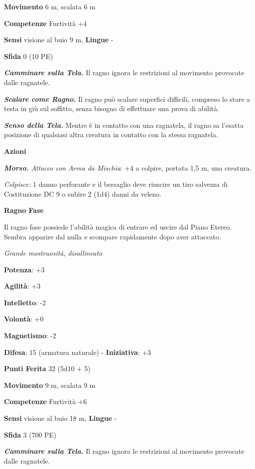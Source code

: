 \begin{multicols}{2}
\textbf{Movimento} 6 m, scalata 6 m

\textbf{Competenze} Furtività +4

\textbf{Sensi} visione al buio 9 m, 
\textbf{Lingue} -

\textbf{Sfida} 0 (10 PE)

\emph{\textbf{Camminare sulla Tela.}} Il ragno ignora le restrizioni al
movimento provocate dalle ragnatele.

\emph{\textbf{Scalare come Ragno.}} Il ragno può scalare superfici
difficili, compreso lo stare a testa in giù sul soffitto, senza bisogno
di effettuare una prova di abilità.

\emph{\textbf{Senso della Tela.}} Mentre è in contatto con una
ragnatela, il ragno sa l'esatta posizione di qualsiasi altra creatura in
contatto con la stessa ragnatela.

\textbf{Azioni}

\emph{\textbf{Morso.} Attacco con Arma da Mischia}: +4 a colpire,
portata 1,5 m, una creatura.

\emph{Colpisce:} 1 danno perforante e il bersaglio deve riuscire un tiro
salvezza di Costituzione DC 9 o subire 2 (1d4) danni da veleno.



\textbf{Ragno Fase}

Il ragno fase possiede l'abilità magica di entrare ed uscire dal Piano
Etereo. Sembra apparire dal nulla e scompare rapidamente dopo aver
attaccato.

\emph{Grande mostruosità, disallineato}

\textbf{Potenza}: +3

\textbf{Agilità}: +3

\textbf{Intelletto}: -2

\textbf{Volontà}: +0

\textbf{Magnetismo}: -2

\textbf{Difesa}: 15 (armatura naturale) - \textbf{Iniziativa}: +3

\textbf{Punti Ferita} 32 (5d10 + 5)

\textbf{Movimento} 9 m, scalata 9 m

\textbf{Competenze} Furtività +6

\textbf{Sensi} visione al buio 18 m, 
\textbf{Lingue} -

\textbf{Sfida} 3 (700 PE)

\emph{\textbf{Camminare sulla Tela.}} Il ragno ignora le restrizioni al
movimento provocate dalle ragnatele.


\end{multicols}
